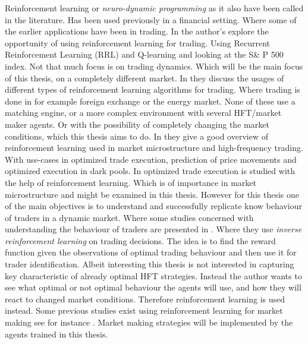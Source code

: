 \documentclass{kththesis}
\theoremstyle{definition}
\begin{document}
Reinforcement learning or \textit{neuro-dynamic programming} as it also have been called in the literature. Has been used previously in a financial setting. Where some of the earlier applications have been in trading. In \textcite{moody1999reinforcement} the author's explore the opportunity of using reinforcement learning for trading. Using Recurrent Reinforcement Learning (RRL) and Q-learning and looking at the S\& P 500 index. Not that much focus is on trading dynamics. Which will be the main focus of  this thesis, on a completely different market. In \parencite{dempster2006automated, du2016algorithm, wang2016reinforcement, casqueiro2006neuro, bertoluzzo2012testing} they discuss the usages of different types of reinforcement learning algorithms for trading. Where trading is done in for example foreign exchange or the energy market. None of these use a matching engine, or a more complex environment with several HFT/market maker agents. Or with the possibility of completely changing the market conditions, which this thesis aims to do. 
\newline
\newline
In \textcite{kearns2013machine} they give a good overview of reinforcement learning used in market microstructure and high-frequency trading. With use-cases in optimized trade execution, prediction of price movements and optimized execution in dark pools. In \parencite{nevmyvaka2006reinforcement, hendricks2014reinforcement}  optimized trade execution is studied with the help of reinforcement learning. Which is of importance in market microstructure and might be examined in this thesis. However for this thesis one of the main objectives is to understand and successfully replicate know behaviour of traders in a dynamic market. Where some studies concerned with understanding the behaviour of traders are presented in \parencite{yang2014algorithmic, yang2012behavior}. Where they use \textit{inverse reinforcement learning} on trading decisions. 
\newline
\newline
The idea is to find the reward function given the observations of optimal trading behaviour and then use it for trader identification. Albeit interesting this thesis is not interested in capturing key characteristic of already optimal HFT strategies. Instead the author wants to see what optimal or not optimal behaviour the agents will use, and how they will react to changed market conditions. Therefore reinforcement learning is used instead. Some previous studies exist using reinforcement learning for market making see for instance \parencite{jumadinova2010comparison,chan2001electronic, fernandez2015high, sherstov2004three}. Market making strategies will be implemented by the agents trained in this thesis.
\end{document}

